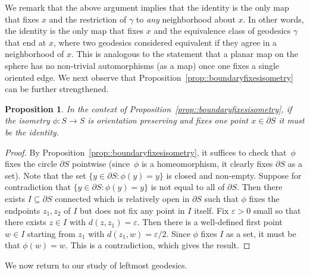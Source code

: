 \documentclass[JEP,XML,SOM,Unicode]{cedram}
\let\epsilon\varepsilon
\theoremstyle{plain}
\numberwithin{theorem}{section}
\newtheorem{proposition}[theorem]{Proposition}
\theoremstyle{definition}
\begin{document}
We remark that the above argument implies that the identity is the only map that fixes $x$ and the restriction of $\gamma$ to \emph{any} neighborhood about $x$. In other words, the identity is the only map that fixes $x$ and the equivalence class of geodesics $\gamma$ that end at $x$, where two geodesics considered equivalent if they agree in a neighborhood of $x$. This is analogous to the statement that a planar map on the sphere has no non-trivial automorphisms (as a map) once one fixes a single oriented edge. We next observe that Proposition~\ref{prop::boundaryfixesisometry} can be further strengthened.

\begin{proposition}
\label{prop::boundaryfixesisometry2}
In the context of Proposition~\ref{prop::boundaryfixesisometry}, if the isometry $\phi \colon S \to S$ is orientation preserving and fixes one point $x \in \partial S$ it must be the identity.
\end{proposition}
\begin{proof}
By Proposition~\ref{prop::boundaryfixesisometry}, it suffices to check that~$\phi$ fixes the circle $\partial S$ pointwise (since~$\phi$ is a homeomorphism, it clearly fixes $\partial S$ as a set). Note that the set $\{y \in \partial S : \phi(y) = y\}$ is closed and non-empty. Suppose for contradiction that $\{ y \in \partial S : \phi(y) = y\}$ is not equal to all of $\partial S$. Then there exists $I \subseteq \partial S$ connected which is relatively open in $\partial S$ such that $\phi$ fixes the endpoints $z_1,z_2$ of $I$ but does not fix any point in $I$ itself. Fix $\epsilon > 0$ small so that there exists $z \in I$ with $d(z,z_1) = \epsilon$. Then there is a well-defined first point $w \in I$ starting from $z_1$ with $d(z_1,w) = \epsilon/2$. Since $\phi$ fixes $I$ as a set, it must be that $\phi(w)=w$. This is a contradiction, which gives the result.
\end{proof}

We now return to our study of leftmost geodesics.
\end{document}
